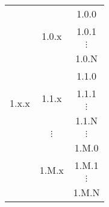 \begin{tabular}{ | *{3}{c|}} \hline
\multirow{ 13}{*}{1.x.x} & \multirow{ 4}{*}{1.0.x} & 1.0.0 \\ \cline{3-3}
& & 1.0.1 \\ \cline{3-3}
 & & $\vdots$ \\ \cline{3-3} 
& & 1.0.N \\ \cline{2-3}

& \multirow{ 4}{*}{1.1.x} & 1.1.0 \\ \cline{3-3} 
& & 1.1.1 \\ \cline{3-3} 
 & & $\vdots$ \\ \cline{3-3} 
& & 1.1.N \\ \cline{2-3}

& $\vdots $ & $\vdots$ \\ \cline{2-3}

& \multirow{ 4}{*}{1.M.x} & 1.M.0 \\ \cline{3-3} 
& & 1.M.1 \\ \cline{3-3} 
 & & $\vdots$ \\ \cline{3-3} 
& & 1.M.N \\ \hline 
\end{tabular}
